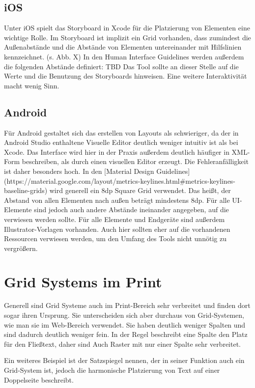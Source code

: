 \subsection{iOS}
Unter iOS spielt das Storyboard in Xcode für die Platzierung von Elementen eine wichtige Rolle. Im Storyboard ist implizit ein Grid vorhanden, dass zumindest die Außenabstände und die Abstände von Elementen untereinander mit Hilfslinien kennzeichnet. (s. Abb. X)
In den Human Interface Guidelines werden außerdem die folgenden Abstände definiert: TBD
Das Tool sollte an dieser Stelle auf die Werte und die Benutzung des Storyboards hinweisen. Eine weitere Interaktivität macht wenig Sinn.

\subsection{Android}
Für Android gestaltet sich das erstellen von Layouts als schwieriger, da der in Android Studio enthaltene Visuelle Editor deutlich weniger intuitiv ist als bei Xcode. Das Interface wird hier in der Praxis außerdem deutlich häufiger in XML-Form beschreiben, als durch einen visuellen Editor erzeugt. Die Fehleranfälligkeit ist daher besonders hoch.
In den [Material Design Guidelines](https://material.google.com/layout/metrics-keylines.html#metrics-keylines-baseline-grids) wird generell ein 8dp Square Grid verwendet. Das heißt, der Abstand von allen Elementen nach außen beträgt mindestens 8dp. Für alle UI-Elemente sind jedoch auch andere Abstände ineinander angegeben, auf die verwiesen werden sollte.
Für alle Elemente und Endgeräte sind außerdem Illustrator-Vorlagen vorhanden. Auch hier sollten eher auf die vorhandenen Ressourcen verwiesen werden, um den Umfang des Tools nicht unnötig zu vergrößern.

\section{Grid Systems im Print}
Generell sind Grid Systeme auch im Print-Bereich sehr verbreitet und finden dort sogar ihren Ursprung. Sie unterscheiden sich aber durchaus von Grid-Systemen, wie man sie im Web-Bereich verwendet. Sie haben deutlich weniger Spalten und sind dadurch deutlich weniger fein. In der Regel beschreibt eine Spalte den Platz für den Fließtext, daher sind Auch Raster mit nur einer Spalte sehr verbreitet.

Ein weiteres Beispiel ist der Satzspiegel nennen, der in seiner Funktion auch ein Grid-System ist, jedoch die harmonische Platzierung von Text auf einer Doppelseite beschreibt.

